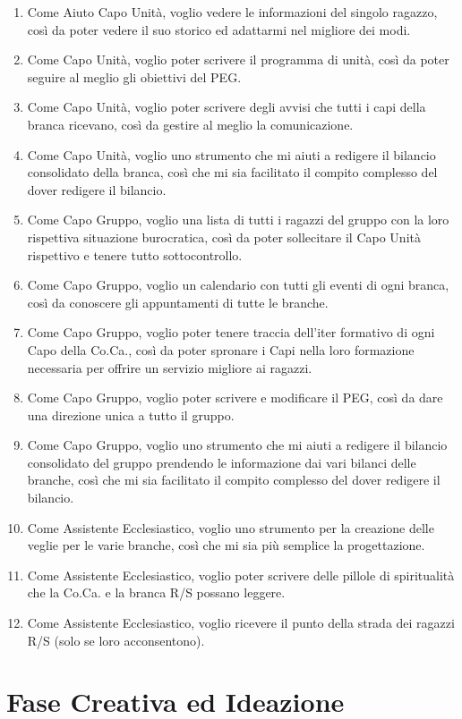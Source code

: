\documentclass[11pt]{article}
\numberwithin{figure}{section}
\begin{document}
\begin{enumerate}[label=\textbf{US\arabic*:}]
 \item Come Aiuto Capo Unità, voglio vedere le informazioni del singolo ragazzo, così da poter vedere il suo storico ed adattarmi nel migliore dei modi.
 \item Come Capo Unità, voglio poter scrivere il programma di unità, così da poter seguire al meglio gli obiettivi del PEG.
 \item Come Capo Unità, voglio poter scrivere degli avvisi che tutti i capi della branca ricevano, così da gestire al meglio la comunicazione.
 \item Come Capo Unità, voglio uno strumento che mi aiuti a redigere il bilancio consolidato della branca, così che mi sia facilitato il compito complesso del dover redigere il bilancio.
 \item Come Capo Gruppo, voglio una lista di tutti i ragazzi del gruppo con la loro rispettiva situazione burocratica, così da poter sollecitare il Capo Unità rispettivo e tenere tutto sottocontrollo.
 \item Come Capo Gruppo, voglio un calendario con tutti gli eventi di ogni branca, così da conoscere gli appuntamenti di tutte le branche.
 \item Come Capo Gruppo, voglio poter tenere traccia dell’iter formativo di ogni Capo della Co.Ca., così da poter spronare i Capi nella loro formazione necessaria per offrire un servizio migliore ai ragazzi.
 \item Come Capo Gruppo, voglio poter scrivere e modificare il PEG, così da dare una direzione unica a tutto il gruppo.
 \item Come Capo Gruppo, voglio uno strumento che mi aiuti a redigere il bilancio consolidato del gruppo prendendo le informazione dai vari bilanci delle branche, così che mi sia facilitato il compito complesso del dover redigere il bilancio.
 \item Come Assistente Ecclesiastico, voglio uno strumento per la creazione delle veglie per le varie branche, così che mi sia più semplice la progettazione.
 \item Come Assistente Ecclesiastico, voglio poter scrivere delle pillole di spiritualità che la Co.Ca. e la branca R/S possano leggere.
 \item Come Assistente Ecclesiastico, voglio ricevere il punto della strada dei ragazzi R/S (solo se loro acconsentono).
\end{enumerate}

\newpage

\section{Fase Creativa ed Ideazione}
\end{document}
